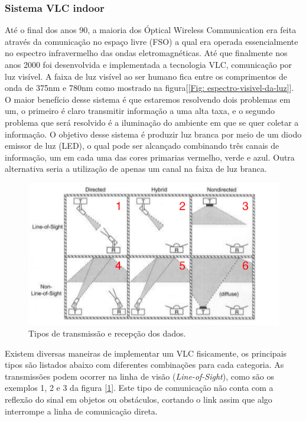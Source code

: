 \subsubsection{Sistema VLC indoor}

Até o final dos anos 90, a maioria dos Óptical Wireless Communication era feita através da comunicação no espaço livre (FSO) a qual era operada essencialmente no espectro infravermelho das ondas eletromagnéticas. Até que finalmente nos anos 2000 foi desenvolvida e implementada a tecnologia VLC, comunicação por luz visível. A faixa de luz visível ao ser humano fica entre os comprimentos de onda de 375nm e 780nm como mostrado na figura[\ref{Fig: espectro-visivel-da-luz}]. O maior benefício desse sistema é que estaremos resolvendo dois problemas em um, o primeiro é claro transmitir informação a uma alta taxa, e o segundo problema que será resolvido é a iluminação do ambiente em que se quer coletar a informação. O objetivo desse sistema é produzir luz branca por meio de um diodo emissor de luz (LED), o qual pode ser alcançado combinando três canais de informação, um em cada uma das cores primarias vermelho, verde e azul. Outra alternativa seria a utilização de apenas um canal na faixa de luz branca. \cite{euntaewon&dongjaeshind.k.jung.2008}


\begin{figure}
	\centering
		\includegraphics[width = 12cm]{figuras/difuso}
	\caption{Tipos de transmissão e recepção dos dados.}
	\label{Fig: difuso}
\end{figure}


Existem diversas maneiras de implementar um VLC fisicamente, os principais tipos são listados abaixo com diferentes combinações para cada categoria.
As transmissões podem ocorrer na linha de visão (\textit{Line-of-Sight}), como são os exemplos 1, 2 e 3 da figura [\ref{Fig: difuso}]. Este tipo de comunicação não conta com a reflexão do sinal em objetos ou obstáculos, cortando o link assim que algo interrompe a linha de comunicação direta.

